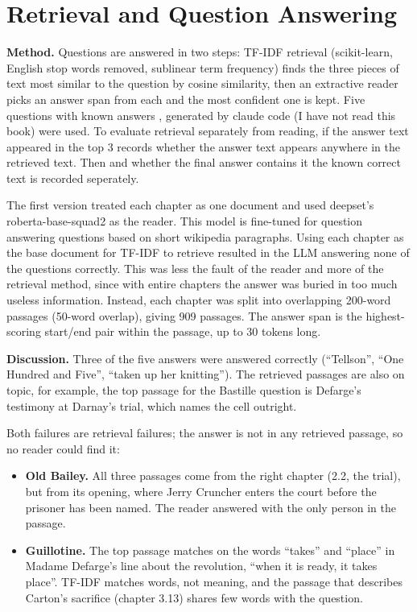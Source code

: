 \documentclass[11pt]{article}
\begin{document}
\section{Retrieval and Question Answering}

\textbf{Method.} Questions are answered in two steps: TF-IDF retrieval
(scikit-learn, English stop words removed, sublinear term frequency)
finds the three pieces of text most similar to the question by cosine
similarity, then an extractive reader picks an answer span from each
and the most confident one is kept. Five questions with known answers
, generated by claude code (I have not read this book) were used. To
evaluate retrieval separately from reading, if the
answer text appeared in the top 3 records whether the answer text
appears anywhere in the retrieved text. Then and whether
the final answer contains it the known correct text is recorded seperately.

The first version treated each chapter as one
document and used deepset's roberta-base-squad2 as the reader. This model is
fine-tuned for question answering questions based on short wikipedia
paragraphs. Using each chapter as the base document for TF-IDF to
retrieve resulted in the LLM answering none of the questions
correctly. This was less the fault of the reader and more of the
retrieval method, since with entire chapters the answer was buried in
too much useless information.  Instead, each chapter was
split into overlapping 200-word passages (50-word overlap), giving
909 passages. The answer span is the highest-scoring
start/end pair within the passage, up to 30 tokens long.

{\small }

\textbf{Discussion.} Three of the five answers were answered correctly
(``Tellson'', ``One
Hundred and Five'', ``taken up her knitting'').  The retrieved
passages are also on topic, for example, the top passage for the
Bastille question is Defarge's testimony at Darnay's trial, which names the cell
outright.

Both failures are retrieval failures; the answer is not in
any retrieved passage, so no reader could find it:
\begin{itemize}
  \item \textbf{Old Bailey.} All three passages come from the right
    chapter (2.2, the
    trial), but from its opening, where Jerry Cruncher enters the
    court before the
    prisoner has been named. The reader answered with the only person
    in the passage.
  \item \textbf{Guillotine.} The top passage matches on the words ``takes'' and
    ``place'' in Madame Defarge's line about the revolution, ``when
    it is ready, it takes
    place''. TF-IDF matches words, not meaning, and the passage that
    describes Carton's
    sacrifice (chapter 3.13) shares few words with the question.
\end{itemize}
\end{document}

